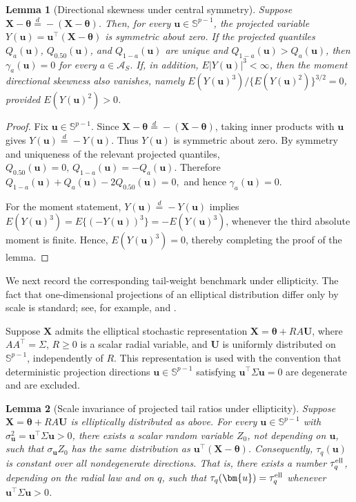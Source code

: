 \documentclass[11pt]{article}
\theoremstyle{plain}
\newtheorem{lemma}{Lemma}
\theoremstyle{definition}
\theoremstyle{remark}
\def\X{\bm{X}}
\def\u{\bm{u}}
\newcommand{\boldtheta}{\bm{\theta}}
\begin{document}
\begin{lemma}[Directional skewness under central symmetry]
	\label{lem:central_symmetry_skewness}
	Suppose \(\X-\boldtheta\stackrel{d}{=}-(\X-\boldtheta)\). Then, for every \(\u\in \mathbb{S}^{p-1}\), the projected variable \(Y(\u)=\u^\top(\X-\boldtheta)\) is symmetric about zero. If the projected quantiles \(Q_a(\u)\), \(Q_{0.50}(\u)\), and \(Q_{1-a}(\u)\) are unique and \(Q_{1-a}(\u)>Q_a(\u)\), then \(\gamma_{a}(\u)=0\) for every \(a\in\mathcal A_S\). If, in addition, \(E|Y(\u)|^3<\infty\), then the moment directional skewness also vanishes, namely \(E(Y(\u)^3)/\{E(Y(\u)^2)\}^{3/2}=0\), provided \(E(Y(\u)^2)>0\).
\end{lemma}

\begin{proof}
	Fix \(\u\in \mathbb{S}^{p-1}\). Since \(\X-\boldtheta\stackrel{d}{=}-(\X-\boldtheta)\), taking inner products with $\u$ gives \(Y(\u)\stackrel{d}{=}-Y(\u)\). Thus \(Y(\u)\) is symmetric about zero. By symmetry and uniqueness of the relevant projected quantiles, \(Q_{0.50}(\u)=0,\,Q_{1-a}(\u)=-Q_a(\u).\) Therefore \(Q_{1-a}(\u)+Q_a(\u)-2Q_{0.50}(\u)=0,\) and hence \(\gamma_{a}(\u)=0\).
    
	For the moment statement, \(Y(\u)\stackrel{d}{=}-Y(\u)\) implies \(E(Y(\u)^3)=E\{(-Y(\u))^3\}=-E(Y(\u)^3)\), whenever the third absolute moment is finite. Hence, \(E(Y(\u)^3)=0\), thereby completing the proof of the lemma.
\end{proof}

We next record the corresponding tail-weight benchmark under ellipticity. The fact that one-dimensional projections of an elliptical distribution differ only by scale is standard; see, for example,  \citet{cambanis1981elliptically} and \citet{fang1990symmetric}. 

Suppose \(\X\) admits the elliptical stochastic representation $\X=\boldtheta+RA\bm{U}$, where \(AA^\top=\Sigma\), \(R\geqslant 0\) is a scalar radial variable, and \(\bm{U}\) is uniformly distributed on \(\mathbb{S}^{p-1}\), independently of \(R\).  This representation is used with the convention that deterministic projection directions \(\u\in\mathbb{S}^{p-1}\) satisfying \(\u^\top\Sigma \u=0\) are degenerate and are excluded.

\begin{lemma}[Scale invariance of projected tail ratios under ellipticity]
	\label{lem:elliptical_tail_ratio}
	Suppose $\X=\boldtheta+RA\bm{U}$ is elliptically distributed as above. For every \(\u\in \mathbb{S}^{p-1}\) with \(\sigma_{\u}^2=\u^\top\Sigma \u>0\), there exists a scalar random variable \(Z_0\), not depending on $\u$, such that $\sigma_{\u} Z_0$ has the same distribution as \(\u^\top(\X-\boldtheta)\). Consequently, \(\tau_q(\u)\) is constant over all nondegenerate directions. That is, there exists a number \(\tau_q^{\rm ell}\), depending on the radial law and on \(q\), such that \(\tau_q(\u)=\tau_q^{\rm ell}\) whenever \(\u^\top\Sigma \u>0\).
\end{lemma}
\end{document}
